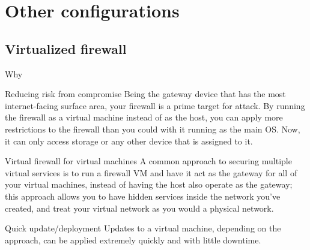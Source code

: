 \documentclass[bigger]{beamer}
\begin{document}
\section{Other configurations}
\label{sec:org319584b}

\subsection{Virtualized firewall}
\label{sec:org8517efe}

\begin{frame}[label={sec:org10a5a15}]{Why}
\begin{block}{Reducing risk from compromise}
Being the gateway device that has the most internet-facing surface area, your
firewall is a prime target for attack. By running the firewall as a virtual
machine instead of as the host, you can apply more restrictions to the
firewall than you could with it running as the main OS. Now, it can only
access storage or any other device that is assigned to it.
\end{block}

\begin{block}{Virtual firewall for virtual machines}
A common approach to securing multiple virtual services is to run a
firewall VM and have it act as the gateway for all of your virtual
machines, instead of having the host also operate as the gateway; this
approach allows you to have hidden services inside the network you've
created, and treat your virtual network as you would a physical
network.
\end{block}

\begin{block}{Quick update/deployment}
Updates to a virtual machine, depending on the approach, can be applied
extremely quickly and with little downtime.
\end{block}
\end{frame}
\end{document}
